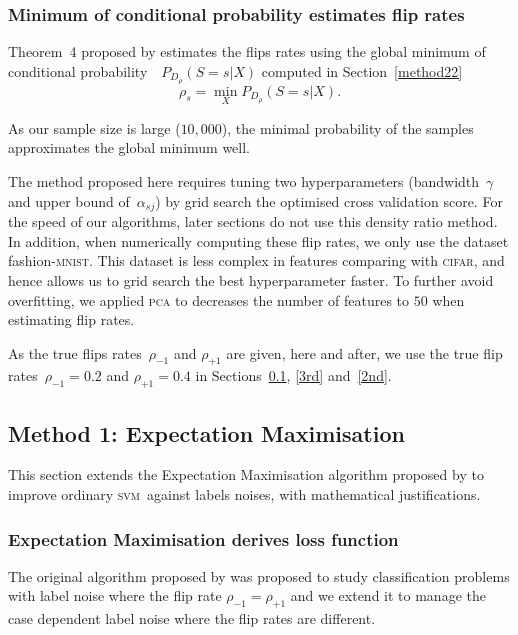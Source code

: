 \documentclass[12pt]{article} %
\newcommand{\svm}{\textsc{svm}}
\newcommand{\rhoo}{\rho_{+1}}
\newcommand{\rhoz}{\rho_{-1}}
\newcommand{\mnist}{fashion-\textsc{mnist}}
\begin{document}
\subsubsection{Minimum of conditional probability estimates flip rates}\label{method23}
Theorem~4 proposed by \citet{liu2016classification} estimates the flips rates using the global minimum of conditional probability~~$P_{D_\rho}(S=s|X)$ computed in Section~\ref{method22}
\begin{equation*}\label{eq:fliprate}
\rho_s=\min _X P_{D_\rho}(S=s|X).
\end{equation*}

As our sample size is large ($10,000$), the minimal probability of the samples approximates the global minimum well.

The method proposed here requires tuning two hyperparameters (bandwidth~$\gamma$ and upper bound of~$\alpha_{sj}$) by grid search the optimised cross validation score. For the speed of our algorithms, later sections do not use this density ratio method.
In addition, when numerically computing these flip rates, we only use the dataset \mnist. This dataset is less complex in features comparing with \textsc{cifar}, and hence allows us to grid search the best hyperparameter faster. To further avoid overfitting, we applied \textsc{pca} to decreases the number of features to $50$ when estimating flip rates.

As the true flips rates~$\rhoz$ and $\rhoo$ are given, here and after, we use the true flip rates~$\rhoz=0.2$ and $\rhoo=0.4$ in Sections~\ref{1st}, \ref{3rd} and~\ref{2nd}.


\subsection{Method 1: Expectation Maximisation}\label{1st}
This section extends the Expectation Maximisation algorithm proposed by \citet{pmlr-v20-biggio11} to improve ordinary \svm\ against labels noises, with mathematical justifications.
\subsubsection{Expectation Maximisation derives loss function}
The original algorithm proposed by \citet{pmlr-v20-biggio11} was proposed to study classification problems with label noise where the flip rate $\rhoz=\rhoo$ and we extend it to manage the case dependent label noise where the flip rates are different.
\end{document}
